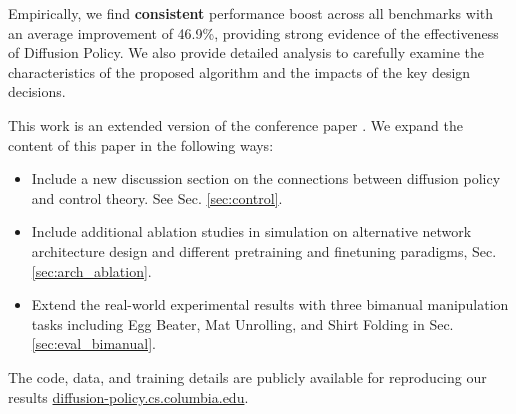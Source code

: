 \documentclass[Afour,sageh,times]{sagej}
\begin{document}
Empirically, we find \textbf{consistent} performance boost across all benchmarks with an average improvement of 46.9\%, providing strong evidence of the effectiveness of Diffusion Policy. We also provide detailed analysis to carefully examine the characteristics of the proposed algorithm and the impacts of the key design decisions. 

This work is an extended version of the conference paper \cite{chi2023diffusionpolicy}.  We expand the content of this paper in the following ways: 
\begin{itemize} %
\item Include a new discussion section on the connections between diffusion policy and control theory. See Sec. \ref{sec:control}.   
\item Include additional ablation studies in simulation on alternative network architecture design and different pretraining and finetuning paradigms, Sec. \ref{sec:arch_ablation}.  
\item Extend the real-world experimental results with three bimanual manipulation tasks including  Egg Beater, Mat Unrolling, and Shirt Folding in  Sec. \ref{sec:eval_bimanual}. 
\end{itemize}

The code, data, and training details are publicly available for reproducing our results \url{diffusion-policy.cs.columbia.edu}.  

\end{document}
